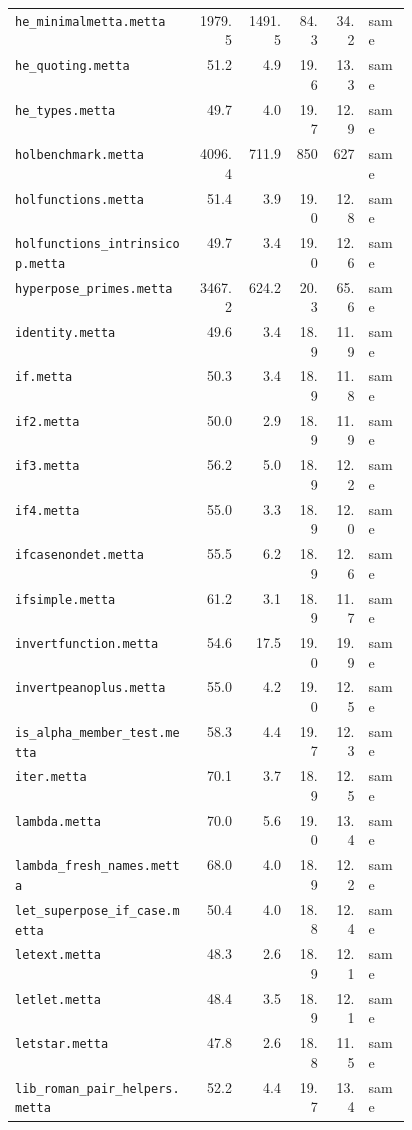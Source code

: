 \begin{longtable}{@{}p{0.46\linewidth}rrrrl@{}}
\nolinkurl{he_minimalmetta.metta} & 1979.5 & 1491.5 & 84.3 & 34.2 & same \\
\nolinkurl{he_quoting.metta} & 51.2 & 4.9 & 19.6 & 13.3 & same \\
\nolinkurl{he_types.metta} & 49.7 & 4.0 & 19.7 & 12.9 & same \\
\nolinkurl{holbenchmark.metta} & 4096.4 & 711.9 & 850 & 627 & same \\
\nolinkurl{holfunctions.metta} & 51.4 & 3.9 & 19.0 & 12.8 & same \\
\nolinkurl{holfunctions_intrinsicop.metta} & 49.7 & 3.4 & 19.0 & 12.6 & same \\
\nolinkurl{hyperpose_primes.metta} & 3467.2 & 624.2 & 20.3 & 65.6 & same \\
\nolinkurl{identity.metta} & 49.6 & 3.4 & 18.9 & 11.9 & same \\
\nolinkurl{if.metta} & 50.3 & 3.4 & 18.9 & 11.8 & same \\
\nolinkurl{if2.metta} & 50.0 & 2.9 & 18.9 & 11.9 & same \\
\nolinkurl{if3.metta} & 56.2 & 5.0 & 18.9 & 12.2 & same \\
\nolinkurl{if4.metta} & 55.0 & 3.3 & 18.9 & 12.0 & same \\
\nolinkurl{ifcasenondet.metta} & 55.5 & 6.2 & 18.9 & 12.6 & same \\
\nolinkurl{ifsimple.metta} & 61.2 & 3.1 & 18.9 & 11.7 & same \\
\nolinkurl{invertfunction.metta} & 54.6 & 17.5 & 19.0 & 19.9 & same \\
\nolinkurl{invertpeanoplus.metta} & 55.0 & 4.2 & 19.0 & 12.5 & same \\
\nolinkurl{is_alpha_member_test.metta} & 58.3 & 4.4 & 19.7 & 12.3 & same \\
\nolinkurl{iter.metta} & 70.1 & 3.7 & 18.9 & 12.5 & same \\
\nolinkurl{lambda.metta} & 70.0 & 5.6 & 19.0 & 13.4 & same \\
\nolinkurl{lambda_fresh_names.metta} & 68.0 & 4.0 & 18.9 & 12.2 & same \\
\nolinkurl{let_superpose_if_case.metta} & 50.4 & 4.0 & 18.8 & 12.4 & same \\
\nolinkurl{letext.metta} & 48.3 & 2.6 & 18.9 & 12.1 & same \\
\nolinkurl{letlet.metta} & 48.4 & 3.5 & 18.9 & 12.1 & same \\
\nolinkurl{letstar.metta} & 47.8 & 2.6 & 18.8 & 11.5 & same \\
\nolinkurl{lib_roman_pair_helpers.metta} & 52.2 & 4.4 & 19.7 & 13.4 & same \\

\end{longtable}
